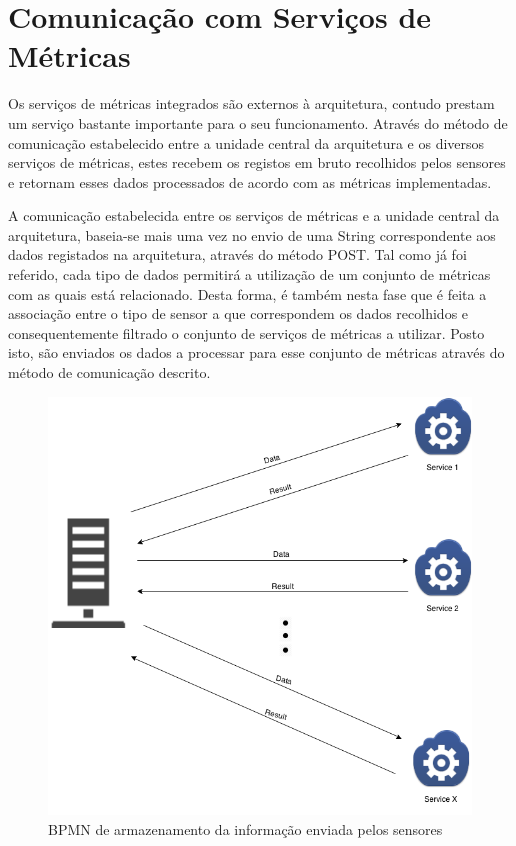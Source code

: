 \section{Comunicação com Serviços de Métricas}

Os serviços de métricas integrados são externos à arquitetura, contudo prestam um serviço bastante importante para o seu funcionamento. Através do método de comunicação estabelecido entre a unidade central da arquitetura e os diversos serviços de métricas, estes recebem os registos em bruto recolhidos pelos sensores e retornam esses dados processados de acordo com as métricas implementadas.

A comunicação estabelecida entre os serviços de métricas e a unidade central da arquitetura, baseia-se mais uma vez no envio de uma String correspondente aos dados registados na arquitetura, através do método POST. Tal como já foi referido, cada tipo de dados permitirá a utilização de um conjunto de métricas com as quais está relacionado. Desta forma, é também nesta fase que é feita a associação entre o tipo de sensor a que correspondem os dados recolhidos e consequentemente filtrado o conjunto de serviços de métricas a utilizar. Posto isto, são enviados os dados a processar para esse conjunto de métricas através do método de  comunicação descrito.

\begin{figure}[htb]
   \centering
   \includegraphics[scale=0.5]{Images/metricsdiagram.png}
   \caption{BPMN de armazenamento da informação enviada pelos sensores}
\end{figure}

